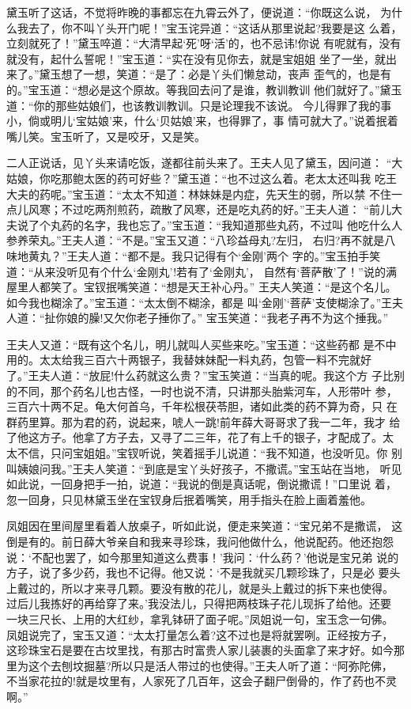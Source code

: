 黛玉听了这话，不觉将昨晚的事都忘在九霄云外了，便说道：“你既这么说，
为什么我去了，你不叫丫头开门呢！”宝玉诧异道：“这话从那里说起?我要是这
么着，立刻就死了！”黛玉啐道：“大清早起‘死’呀‘活’的，也不忌讳!你说
有呢就有，没有就没有，起什么誓呢！”宝玉道：“实在没有见你去，就是宝姐姐
坐了一坐，就出来了。”黛玉想了一想，笑道：“是了：必是丫头们懒怠动，丧声
歪气的，也是有的。”宝玉道：“想必是这个原故。等我回去问了是谁，教训教训
他们就好了。”黛玉道：“你的那些姑娘们，也该教训教训。只是论理我不该说。
今儿得罪了我的事小，倘或明儿‘宝姑娘’来，什么‘贝姑娘’来，也得罪了，事
情可就大了。”说着抿着嘴儿笑。宝玉听了，又是咬牙，又是笑。

二人正说话，见丫头来请吃饭，遂都往前头来了。王夫人见了黛玉，因问道：
“大姑娘，你吃那鲍太医的药可好些？”黛玉道：“也不过这么着。老太太还叫我
吃王大夫的药呢。”宝玉道：“太太不知道：林妹妹是内症，先天生的弱，所以禁
不住一点儿风寒；不过吃两剂煎药，疏散了风寒，还是吃丸药的好。”王夫人道：
“前儿大夫说了个丸药的名字，我也忘了。”宝玉道：“我知道那些丸药，不过叫
他吃什么人参养荣丸。”王夫人道：“不是。”宝玉又道：“八珍益母丸?左归，
右归?再不就是八味地黄丸？”王夫人道：“都不是。我只记得有个‘金刚’两个
字的。”宝玉拍手笑道：“从来没听见有个什么‘金刚丸’!若有了‘金刚丸’，
自然有‘菩萨散’了！”说的满屋里人都笑了。宝钗抿嘴笑道：“想是天王补心丹。”
王夫人笑道：“是这个名儿。如今我也糊涂了。”宝玉道：“太太倒不糊涂，都是
叫‘金刚’‘菩萨’支使糊涂了。”王夫人道：“扯你娘的臊!又欠你老子捶你了。”
宝玉笑道：“我老子再不为这个捶我。”

王夫人又道：“既有这个名儿，明儿就叫人买些来吃。”宝玉道：“这些药都
是不中用的。太太给我三百六十两银子，我替妹妹配一料丸药，包管一料不完就好
了。”王夫人道：“放屁!什么药就这么贵？”宝玉笑道：“当真的呢。我这个方
子比别的不同，那个药名儿也古怪，一时也说不清，只讲那头胎紫河车，人形带叶
参，三百六十两不足。龟大何首乌，千年松根茯苓胆，诸如此类的药不算为奇，只
在群药里算。那为君的药，说起来，唬人一跳!前年薛大哥哥求了我一二年，我才
给了他这方子。他拿了方子去，又寻了二三年，花了有上千的银子，才配成了。太
太不信，只问宝姐姐。”宝钗听说，笑着摇手儿说道：“我不知道，也没听见。你
别叫姨娘问我。”王夫人笑道：“到底是宝丫头好孩子，不撒谎。”宝玉站在当地，
听见如此说，一回身把手一拍，说道：“我说的倒是真话呢，倒说撒谎！”口里说
着，忽一回身，只见林黛玉坐在宝钗身后抿着嘴笑，用手指头在脸上画着羞他。

凤姐因在里间屋里看着人放桌子，听如此说，便走来笑道：“宝兄弟不是撒谎，
这倒是有的。前日薛大爷亲自和我来寻珍珠，我问他做什么，他说配药。他还抱怨
说：‘不配也罢了，如今那里知道这么费事！’我问：‘什么药？’他说是宝兄弟
说的方子，说了多少药，我也不记得。他又说：‘不是我就买几颗珍珠了，只是必
要头上戴过的，所以才来寻几颗。要没有散的花儿，就是头上戴过的拆下来也使得。
过后儿我拣好的再给穿了来。’我没法儿，只得把两枝珠子花儿现拆了给他。还要
一块三尺长、上用的大红纱，拿乳钵研了面子呢。”凤姐说一句，宝玉念一句佛。
凤姐说完了，宝玉又道：“太太打量怎么着?这不过也是将就罢咧。正经按方子，
这珍珠宝石是要在古坟里找，有那古时富贵人家儿装裹的头面拿了来才好。如今那
里为这个去刨坟掘墓?所以只是活人带过的也使得。”王夫人听了道：“阿弥陀佛，
不当家花拉的!就是坟里有，人家死了几百年，这会子翻尸倒骨的，作了药也不灵
啊。”

